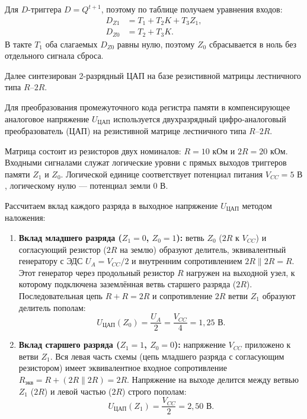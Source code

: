 \documentclass[14pt, a4paper]{extarticle}
\begin{document}
	Для $D$-триггера $D = Q^{t+1}$, поэтому по таблице получаем уравнения входов:
	\begin{align*}
		D_{Z1} &= T_1 + T_2 K + T_3 Z_1, \\
		D_{Z0} &= T_2 + T_3 K.
	\end{align*}
	В такте $T_1$ оба слагаемых $D_{Z0}$ равны нулю, поэтому $Z_0$ сбрасывается в ноль без отдельного сигнала сброса.
	
	Далее синтезирован 2-разрядный ЦАП на базе резистивной матрицы лестничного типа $R$--$2R$.
	
	Для преобразования промежуточного кода регистра памяти в компенсирующее аналоговое напряжение $U_{\text{ЦАП}}$ используется двухразрядный цифро-аналоговый преобразователь (ЦАП) на резистивной матрице лестничного типа $R$--$2R$.
	
	Матрица состоит из резисторов двух номиналов: $R = 10\text{ кОм}$ и $2R = 20\text{ кОм}$. Входными сигналами служат логические уровни с прямых выходов триггеров памяти $Z_1$ и $Z_0$. Логической единице соответствует потенциал питания $V_{CC} = 5\text{ В}$, логическому нулю — потенциал земли $0\text{ В}$.
	
	Рассчитаем вклад каждого разряда в выходное напряжение $U_{\text{ЦАП}}$ методом наложения:
	\begin{enumerate}
		\item \textbf{Вклад младшего разряда ($Z_1 = 0$, $Z_0 = 1$):} ветвь $Z_0$ ($2R$ к $V_{CC}$) и согласующий резистор ($2R$ на землю) образуют делитель, эквивалентный генератору с ЭДС $U_A = V_{CC}/2$ и внутренним сопротивлением $2R \parallel 2R = R$. Этот генератор через продольный резистор $R$ нагружен на выходной узел, к которому подключена заземлённая ветвь старшего разряда ($2R$). Последовательная цепь $R + R = 2R$ и сопротивление $2R$ ветви $Z_1$ образуют делитель пополам:
		\begin{equation*}
			U_{\text{ЦАП}}(Z_0) = \frac{U_A}{2} = \frac{V_{CC}}{4} = 1{,}25\text{ В}.
		\end{equation*}
		\item \textbf{Вклад старшего разряда ($Z_1 = 1$, $Z_0 = 0$):} напряжение $V_{CC}$ приложено к ветви $Z_1$. Вся левая часть схемы (цепь младшего разряда с согласующим резистором) имеет эквивалентное входное сопротивление $R_{\text{экв}} = R + (2R \parallel 2R) = 2R$. Напряжение на выходе делится между ветвью $Z_1$ ($2R$) и левой частью ($2R$) строго пополам:
		\begin{equation*}
			U_{\text{ЦАП}}(Z_1) = \frac{V_{CC}}{2} = 2{,}50\text{ В}.
		\end{equation*}
	\end{enumerate}
	
\end{document}
